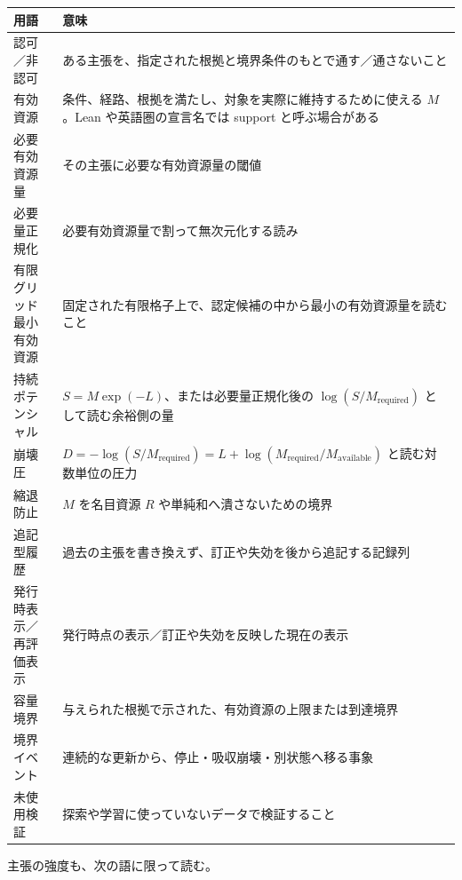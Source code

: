 \documentclass[12pt,a4paper]{article}
\begin{document}
{\def\LTcaptype{table} %
\begin{longtable}[]{@{}
  >{\raggedright\arraybackslash}p{}
  >{\raggedright\arraybackslash}p{}@{}}
\toprule\noalign{}
\begin{minipage}[b]{\linewidth}\raggedright
用語
\end{minipage} & \begin{minipage}[b]{\linewidth}\raggedright
意味
\end{minipage} \\
\midrule\noalign{}
\endhead
\bottomrule\noalign{}
\endlastfoot
認可／非認可 & ある主張を、指定された根拠と境界条件のもとで通す／通さないこと \\
有効資源 & 条件、経路、根拠を満たし、対象を実際に維持するために使える \(M\)。Lean や英語圏の宣言名では support と呼ぶ場合がある \\
必要有効資源量 & その主張に必要な有効資源量の閾値 \\
必要量正規化 & 必要有効資源量で割って無次元化する読み \\
有限グリッド最小有効資源 & 固定された有限格子上で、認定候補の中から最小の有効資源量を読むこと \\
持続ポテンシャル & \(S=M\exp(-L)\)、または必要量正規化後の \(\log(S/M_{\mathrm{required}})\) として読む余裕側の量 \\
崩壊圧 & \(D=-\log(S/M_{\mathrm{required}})=L+\log(M_{\mathrm{required}}/M_{\mathrm{available}})\) と読む対数単位の圧力 \\
縮退防止 & \(M\) を名目資源 \(R\) や単純和へ潰さないための境界 \\
追記型履歴 & 過去の主張を書き換えず、訂正や失効を後から追記する記録列 \\
発行時表示／再評価表示 & 発行時点の表示／訂正や失効を反映した現在の表示 \\
容量境界 & 与えられた根拠で示された、有効資源の上限または到達境界 \\
境界イベント & 連続的な更新から、停止・吸収崩壊・別状態へ移る事象 \\
未使用検証 & 探索や学習に使っていないデータで検証すること \\
\end{longtable}
}

主張の強度も、次の語に限って読む。
\end{document}
